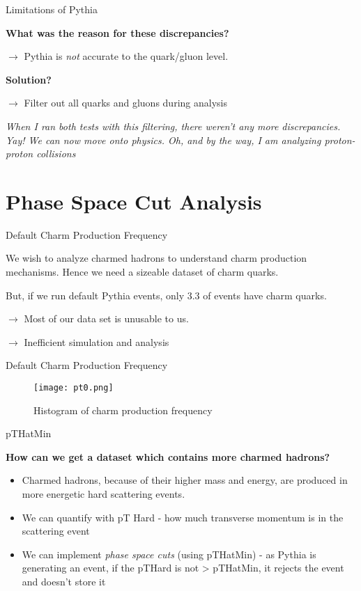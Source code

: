 \documentclass[10pt]{beamer}
\begin{document}
\begin{frame}{Limitations of Pythia}

\textbf{What was the reason for these discrepancies?}

$\rightarrow$ Pythia is \textit{not} accurate to the quark/gluon level. 
\vspace{1em}

\textbf{Solution?}

$\rightarrow$ Filter out all quarks and gluons during analysis
\vspace{1em}

\textit{When I ran both tests with this filtering, there weren't any more discrepancies. Yay! We can now move onto physics. Oh, and by the way, I am analyzing proton-proton collisions}
    
\end{frame}

\section{Phase Space Cut Analysis}

\begin{frame}{Default Charm Production Frequency}

We wish to analyze charmed hadrons to understand charm production mechanisms. Hence we need a sizeable dataset of charm quarks.

But, if we run default Pythia events, only 3.3\text{\%} of events have charm quarks. 

$\rightarrow$ Most of our data set is unusable to us. 

$\rightarrow$ Inefficient simulation and analysis
    
\end{frame}

\begin{frame}{Default Charm Production Frequency}

\begin{figure}[h]
  \centering
  \texttt{[image: pt0.png]}
  \caption{Histogram of charm production frequency}
  \label{fig:pt0}
\end{figure}
\end{frame}

\begin{frame}{pTHatMin}

\textbf{How can we get a dataset which contains more charmed hadrons?}
\begin{itemize}
    \item Charmed hadrons, because of their higher mass and energy, are produced in more energetic hard scattering events. 
    \item We can quantify with pT Hard - how much transverse momentum is in the scattering event
    \item We can implement \textit{phase space cuts} (using pTHatMin) - as Pythia is generating an event, if the pTHard is not > pTHatMin, it rejects the event and doesn't store it
\end{itemize}
\end{frame}
\end{document}
